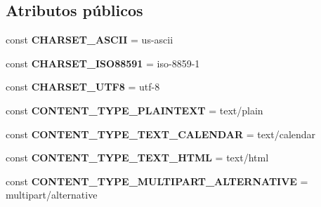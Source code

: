 \subsection*{Atributos públicos}
\begin{DoxyCompactItemize}
\item 
\mbox{\label{classPHPMailer_1_1PHPMailer_1_1PHPMailer_a99f54567235c6eadd4c4b25e2f2fddf5}} 
const {\bfseries C\+H\+A\+R\+S\+E\+T\+\_\+\+A\+S\+C\+II} = \textquotesingle{}us-\/ascii\textquotesingle{}
\item 
\mbox{\label{classPHPMailer_1_1PHPMailer_1_1PHPMailer_ab735c67694ba6e8e5e1695d7d7b8bd3a}} 
const {\bfseries C\+H\+A\+R\+S\+E\+T\+\_\+\+I\+S\+O88591} = \textquotesingle{}iso-\/8859-\/1\textquotesingle{}
\item 
\mbox{\label{classPHPMailer_1_1PHPMailer_1_1PHPMailer_a959beede1f53b676a98b4f89d1070d8b}} 
const {\bfseries C\+H\+A\+R\+S\+E\+T\+\_\+\+U\+T\+F8} = \textquotesingle{}utf-\/8\textquotesingle{}
\item 
\mbox{\label{classPHPMailer_1_1PHPMailer_1_1PHPMailer_aacb994f7e0c6fe5463c51926434ea015}} 
const {\bfseries C\+O\+N\+T\+E\+N\+T\+\_\+\+T\+Y\+P\+E\+\_\+\+P\+L\+A\+I\+N\+T\+E\+XT} = \textquotesingle{}text/plain\textquotesingle{}
\item 
\mbox{\label{classPHPMailer_1_1PHPMailer_1_1PHPMailer_a2d95a498045f57e88b34c8737d211568}} 
const {\bfseries C\+O\+N\+T\+E\+N\+T\+\_\+\+T\+Y\+P\+E\+\_\+\+T\+E\+X\+T\+\_\+\+C\+A\+L\+E\+N\+D\+AR} = \textquotesingle{}text/calendar\textquotesingle{}
\item 
\mbox{\label{classPHPMailer_1_1PHPMailer_1_1PHPMailer_ad1909cdfd423010a28279bd80c89fb4d}} 
const {\bfseries C\+O\+N\+T\+E\+N\+T\+\_\+\+T\+Y\+P\+E\+\_\+\+T\+E\+X\+T\+\_\+\+H\+T\+ML} = \textquotesingle{}text/html\textquotesingle{}
\item 
\mbox{\label{classPHPMailer_1_1PHPMailer_1_1PHPMailer_a5ac107781c7cc1d6fd5a3b1c17c0d30f}} 
const {\bfseries C\+O\+N\+T\+E\+N\+T\+\_\+\+T\+Y\+P\+E\+\_\+\+M\+U\+L\+T\+I\+P\+A\+R\+T\+\_\+\+A\+L\+T\+E\+R\+N\+A\+T\+I\+VE} = \textquotesingle{}multipart/alternative\textquotesingle{}

\end{DoxyCompactItemize}
